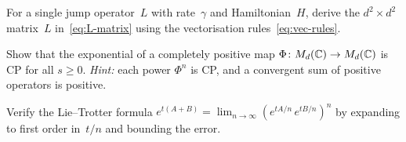 \begin{exercise}\label{ex:vectorise-lindblad}
  For a single jump operator~$L$ with rate~$\gamma$ and
  Hamiltonian~$H$, derive the $d^2\times d^2$ matrix~$L$
  in~\eqref{eq:L-matrix} using the vectorisation
  rules~\eqref{eq:vec-rules}.
\end{exercise}

\begin{exercise}\label{ex:cp-exponential}
  Show that the exponential of a completely positive map
  $\Phi\colon M_{d}(\mathbb{C})\to M_{d}(\mathbb{C})$ is CP for all $s \geq 0$.
  \emph{Hint:} each power $\Phi^n$ is CP, and a convergent sum of
  positive operators is positive.
\end{exercise}

\begin{exercise}\label{ex:trotter}
  Verify the Lie--Trotter formula
  $e^{t(A+B)} = \lim_{n\to\infty}(e^{tA/n}\,e^{tB/n})^n$ by
  expanding to first order in~$t/n$ and bounding the error.
\end{exercise}
